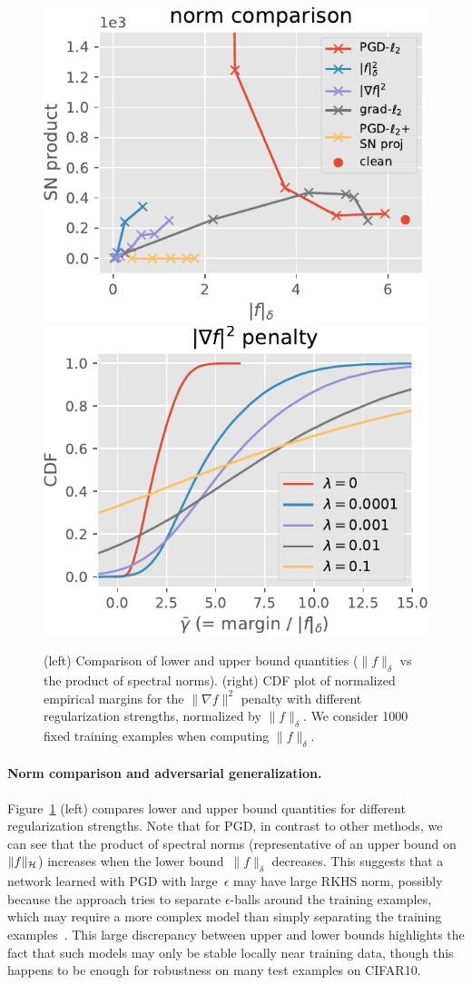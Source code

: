 \begin{figure}[tb]
	\centering
	\includegraphics[width=.48\columnwidth]{figures/cifar10_vgg/norm_comp_sn_prod.pdf}%
	\includegraphics[width=.48\columnwidth]{figures/cifar10_vgg/jacobianl2max_margins_kernel_multi.pdf}
        \vspace*{-0.1cm}
	\caption{(left) Comparison of lower and upper bound quantities ($\|f\|_\delta$ vs the product of spectral norms).
	(right) CDF plot of normalized empirical margins for the $\|\nabla f\|^2$ penalty with different
	regularization strengths, normalized by $\|f\|_\delta$.
	We consider 1000 fixed training examples when computing $\|f\|_\delta$.}
        \vspace*{-0.2cm}
	\label{fig:norms_and_margins}
\end{figure}

\vspace*{-0.2cm}
\paragraph{Norm comparison and adversarial generalization.}
Figure~\ref{fig:norms_and_margins} (left) compares lower and upper bound quantities
for different regularization strengths.
Note that for PGD, in contrast to other methods, we can see that the product of spectral norms (representative of an upper bound on~$\|f\|_{\mathcal H}$) increases when the lower bound~$\|f\|_\delta$ decreases.
This suggests that a network learned with PGD with large~$\epsilon$ may have large RKHS norm, possibly because the approach
tries to separate $\epsilon$-balls around the training examples,
which may require a more complex model than simply separating the training
examples~\citep[see also][]{madry2018towards}.
This large discrepancy between upper and lower bounds highlights the fact that such models may only
be stable locally near training data, though this happens to be enough for robustness on many test examples on CIFAR10.

